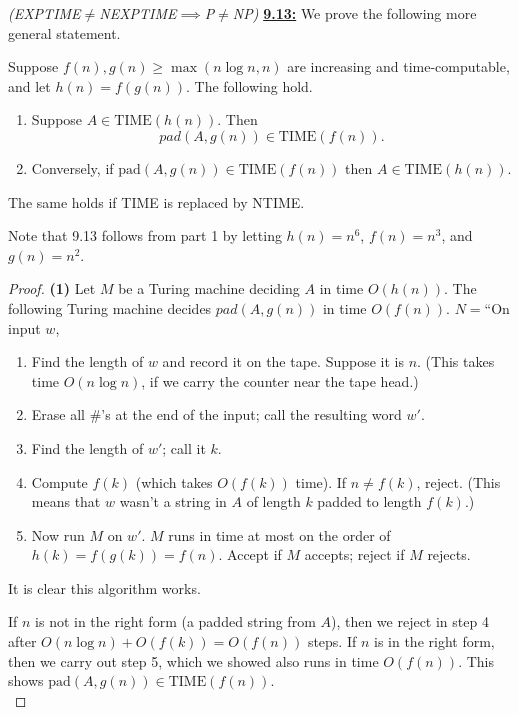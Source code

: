 \begin{problem}{\it(EXPTIME$\ne$NEXPTIME$\implies$P$\ne$NP)}
\underline{\textbf{9.13:}} 
We prove the following more general statement.
\begin{thm}
Suppose $f(n),g(n)\ge \max(n\log n,n)$ are increasing and time-computable, and let $h(n)=f(g(n))$. 
The following hold.
\begin{enumerate}
\item
Suppose $A\in \text{TIME}(h(n))$. Then
\[
{pad}(A,g(n))\in \text{TIME}(f(n)).
\]
\item
Conversely, if $\text{pad}(A,g(n))\in \text{TIME}(f(n))$ then $A\in \text{TIME}(h(n))$.
\end{enumerate}
The same holds if TIME is replaced by NTIME.
\end{thm}
Note that 9.13 follows from part 1 by letting $h(n)=n^6$, $f(n)=n^3$, and $g(n)=n^2$.
\begin{proof}
\textbf{(1)} 
Let $M$ be a Turing machine deciding $A$ in time $O(h(n))$.
The following Turing machine decides ${pad}(A,g(n))$ in time $O(f(n))$. $N=$``On input $w$,
\begin{enumerate}
\item
Find the length of $w$ and record it on the tape. Suppose it is $n$. (This takes time $O(n\log n)$, if we carry the counter near the tape head.) 
\item
Erase all $\#$'s at the end of the input; call the resulting word $w'$.
\item
Find the length of $w'$; call it $k$. 
\item
Compute $f(k)$ (which takes $O(f(k))$ time). If $n\ne f(k)$, reject. (This means that $w$ wasn't a string in $A$ of length $k$ padded to length $f(k)$.) 
\item
Now run $M$ on $w'$. $M$ runs in time at most on the order of $h(k)=f(g(k))=f(n)$.
Accept if $M$ accepts; reject if $M$ rejects.
\end{enumerate}
It is clear this algorithm works.

If $n$ is not in the right form (a padded string from $A$), then we reject in step 4 after $O(n\log n)+O(f(k))=O(f(n))$ steps. If $n$ is in the right form, then we carry out step 5, which we showed also runs in time $O(f(n))$. This shows $\text{pad}(A,g(n))\in \text{TIME}(f(n))$.\\


\end{proof}
\end{problem}
